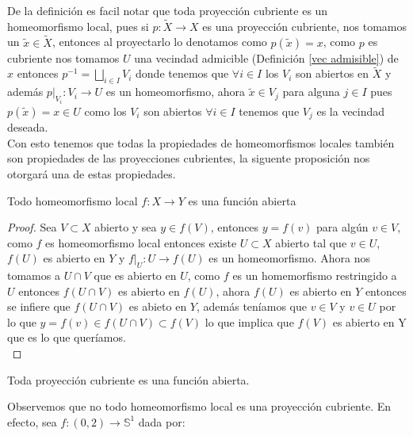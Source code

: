 De la definici\'on es facil notar que toda proyecci\'on cubriente es un homeomorfismo local, pues si $p:\widetilde{X} \rightarrow X$ es una proyecci\'on cubriente, nos tomamos un $\widetilde{x} \in \widetilde{X}$, entonces al proyectarlo lo denotamos como $p(\widetilde{x})=x$, como $p$ es cubriente nos tomamos $U$ una vecindad admicible (Definici\'on \ref{vec admisible}) de $x$ entonces $p^{-1}=\bigsqcup_{i \in I}V_i$ donde tenemos que $\forall i \in I$ los $V_i$ son abiertos en $\widetilde{X}$ y adem\'as $p \vert_{V_i}:V_i \rightarrow U$ es un homeomorfismo, ahora $\widetilde{x} \in V_j$ para alguna $j \in I$ pues $p(\widetilde{x})=x \in U$ como los $V_i$ son abiertos $\forall i \in I$ tenemos que $V_j$ es la vecindad deseada.\\
Con esto tenemos que todas la propiedades de homeomorfismos locales tambi\'en son propiedades de las proyecciones cubrientes, la siguente proposici\'on nos otorgar\'a una de estas propiedades.\\

\begin{proposition}\label{proy ab}
Todo homeomorfismo local $f:X \rightarrow Y$ es una funci\'on abierta
\end{proposition}

\begin{proof} 
Sea $V \subset X$ abierto y sea $y \in f(V)$, entonces $y=f(v)$ para alg\'un $v \in V$, como $f$ es homeomorfismo local entonces existe $U \subset X$ abierto tal que $v \in U$, $f(U)$ es abierto en $Y$ y $f \vert_{U}:U \rightarrow f(U)$ es un homeomorfismo. 
Ahora nos tomamos a $U \cap V$ que es abierto en $U$, como $f$ es un homemorfismo restringido a $U$ entonces $f(U \cap V)$ es abierto en $f(U)$, ahora $f(U)$ es abierto en $Y$ entonces se infiere que $f(U \cap V)$ es abieto en $Y$, adem\'as ten\'iamos que $v \in V$ y $v \in U$ por lo que $y=f(v)\in f(U \cap V) \subset f(V)$ lo que implica que $f(V)$ es abierto en Y que es lo que quer\'iamos.\\
\end{proof}

\begin{corollary}
Toda proyecci\'on cubriente es una funci\'on abierta.
\end{corollary}


Observemos que no todo homeomorfismo local es una proyecci\'on cubriente. En efecto, sea $f:(0,2) \rightarrow \mathbb S^1$ dada por:


